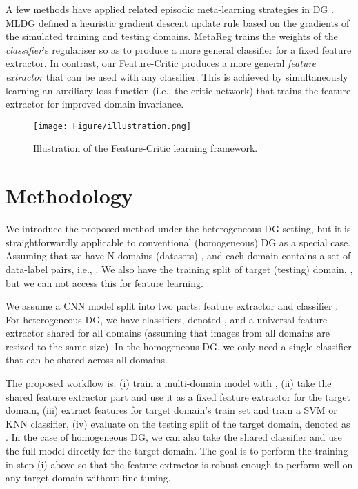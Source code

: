 \documentclass{article}
\newcommand{\modelname}{Feature-Critic}
\begin{document}
A few methods have applied related episodic meta-learning strategies in DG \cite{Li18,Balaji18}. MLDG \cite{Li18} defined a heuristic gradient descent update rule based on the gradients of the simulated training and testing domains. MetaReg \cite{Balaji18} trains the weights of the \emph{classifier}'s regulariser so as to produce a more general classifier for a fixed feature extractor. In contrast,  our \modelname{} produces a more general \emph{feature extractor} that can be used with any classifier. This is achieved by simultaneously learning an auxiliary loss function \cite{gygli2017deepValueNet,yang2017metacritic} (i.e., the critic network) that trains the feature extractor for improved domain invariance.

\begin{figure}[t]
\centering
\texttt{[image: Figure/illustration.png]}
\caption{Illustration of the \modelname{} learning framework.} \label{fig:illu}
\vspace{-1.0em}
\end{figure}


\section{Methodology}

We  introduce the proposed method under the heterogeneous DG setting, but it is straightforwardly applicable to conventional (homogeneous) DG as a special case. Assuming that we have N domains (datasets) , and each domain contains a set of data-label pairs, i.e., . We also have the training split of target (testing) domain, , but  we can not access this for feature learning. 

We assume a CNN model split into two parts: feature extractor  and classifier . For heterogeneous DG, we have  classifiers, denoted , and a universal feature extractor   shared for all domains (assuming that images from all domains are resized to the same size). In the homogeneous DG, we only need a single classifier  that can be shared across all domains. 


The proposed workflow is: (i) train a multi-domain model  with , (ii) take the shared feature extractor part  and use it as a fixed feature extractor for the target domain, (iii) extract features for target domain's train set  and train a SVM or KNN classifier, (iv) evaluate on the testing split of the target domain, denoted as . In the case of homogeneous DG, we can also take the shared classifier  and use the full model  directly for the target domain. The goal is to perform the training in step (i) above so that the feature extractor  is robust enough to perform well on any target domain without fine-tuning.
\end{document}
